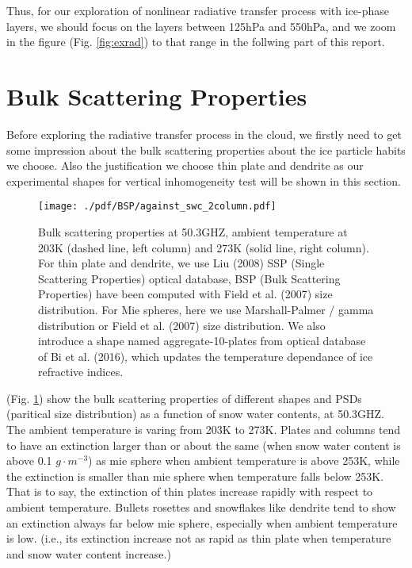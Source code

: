 \documentclass[a4paper]{report}
\begin{document}
Thus, for our exploration of nonlinear radiative transfer process with ice-phase layers, we should focus on the layers between
125hPa and 550hPa, and we zoom in the figure (Fig. \ref{fig:exrad}) to that range in the follwing part of this report.

\clearpage

\section{Bulk Scattering Properties}
Before exploring the radiative transfer process in the cloud, we firstly need to get some impression about the bulk scattering properties 
about the ice particle habits we choose. Also the justification we choose thin plate and dendrite as our experimental shapes for vertical inhomogeneity
test will be shown in this section.

\begin{figure}[hbtp] 
\centering
\texttt{[image: ./pdf/BSP/against\_swc\_2column.pdf]}
\caption{Bulk scattering properties at 50.3GHZ, ambient temperature at 203K (dashed line, left column) and 273K (solid line, right column).
For thin plate and dendrite, we use Liu (2008) SSP (Single Scattering Properties) optical database,
BSP (Bulk Scattering Properties) have been computed with Field et al. (2007) size distribution.
For Mie spheres, here we use Marshall-Palmer / gamma distribution or Field et al. (2007) size distribution.
We also introduce a shape named aggregate-10-plates from optical database of Bi et al. (2016), which updates the temperature dependance 
of ice refractive indices.}
\label{fig:against_swc_2column}
\end{figure}

(Fig. \ref{fig:against_swc_2column}) show the bulk scattering properties of different shapes and PSDs (paritical size distribution) as a
function of snow water contents, at 50.3GHZ. The ambient temperature is varing from 203K to 273K. Plates and columns tend to have an
extinction larger than or about the same (when snow water content is above 0.1 $g \cdot m^{-3}$) as mie sphere when ambient temperature is above 253K,
while the extinction is smaller than mie sphere when temperature falls below 253K. That is to say, the extinction of thin plates increase rapidly with respect to ambient temperature.
Bullets rosettes and snowflakes like dendrite tend to show an extinction always far below mie sphere, especially when ambient temperature is low. (i.e., its extinction
increase not as rapid as thin plate when temperature and snow water content increase.)
\end{document}
